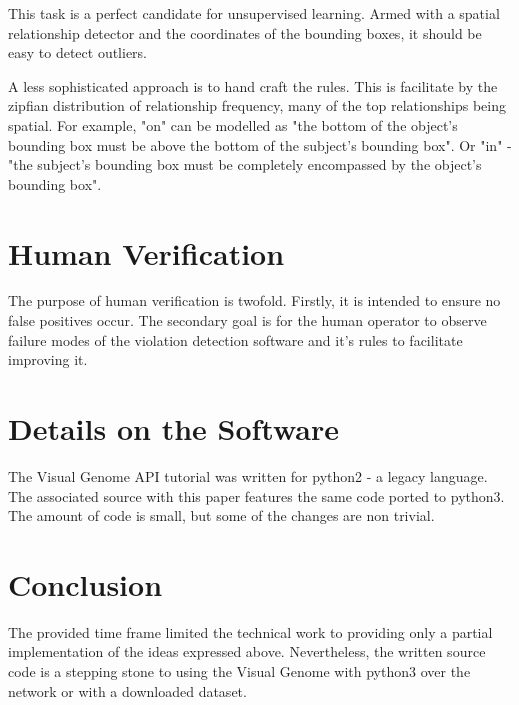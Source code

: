 \documentclass{article}
\begin{document}
This task is a perfect candidate for unsupervised learning.
Armed with a spatial relationship detector and the coordinates of the bounding boxes, it should be easy to detect outliers.

A less sophisticated approach is to hand craft the rules.
This is facilitate by the zipfian distribution of relationship frequency, many of the top relationships being spatial\parencite{krishna}. 
For example, "on" can be modelled as "the bottom of the object's bounding box must be above the bottom of the subject's bounding box".
Or "in" - "the subject's bounding box must be completely encompassed by the object's bounding box".


\section{Human Verification}
The purpose of human verification is twofold.
Firstly, it is intended to ensure no false positives occur.
The secondary goal is for the human operator to observe failure modes of the violation detection software and it's rules to facilitate improving it.


\section{Details on the Software}
The Visual Genome API tutorial was written for python2 - a legacy language.
The associated source with this paper features the same code ported to python3.
The amount of code is small, but some of the changes are non trivial.


\section{Conclusion}
The provided time frame limited the technical work to providing only a partial implementation of the ideas expressed above.
Nevertheless, the written source code is a stepping stone to using the Visual Genome with python3 over the network or with a downloaded dataset.


\printbibliography
\end{document}
